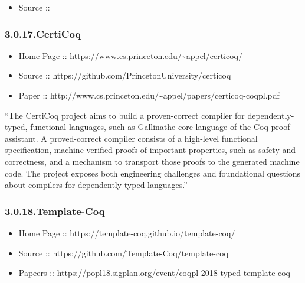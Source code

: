 \documentclass[12pt,twoside]{article}
\begin{document}
\begin{itemize}[noitemsep,topsep=\mdcompacttopsep]%

\item{}Source ::%
\end{itemize}%

\subsubsection{3.0.17.\hspace*{0.5em}CertiCoq}\label{sec-certicoq}%

\begin{itemize}[noitemsep,topsep=\mdcompacttopsep]%

\item{}Home Page :: https://www.cs.princeton.edu/\textasciitilde{}appel/certicoq/%

\item{}Source :: https://github.com/PrincetonUniversity/certicoq%

\item{}Paper :: http://www.cs.princeton.edu/\textasciitilde{}appel/papers/certicoq-coqpl.pdf%
\end{itemize}%

\noindent{}\textquotedblleft{}The CertiCoq project aims to build a proven-correct compiler for
dependently-typed, functional languages, such as Gallinathe core
language of the Coq proof assistant. A proved-correct compiler
consists of a high-level functional specification, machine-verified
proofs of important properties, such as safety and correctness, and a
mechanism to transport those proofs to the generated machine code. The
project exposes both engineering challenges and foundational questions
about compilers for dependently-typed languages.\textquotedblright{}%

\subsubsection{3.0.18.\hspace*{0.5em}Template-Coq}\label{sec-template-coq}%

\begin{itemize}[noitemsep,topsep=\mdcompacttopsep]%

\item{}Home Page :: https://template-coq.github.io/template-coq/%

\item{}Source :: https://github.com/Template-Coq/template-coq%

\item{}Papeers :: https://popl18.sigplan.org/event/coqpl-2018-typed-template-coq%
\end{itemize}%
\end{document}
